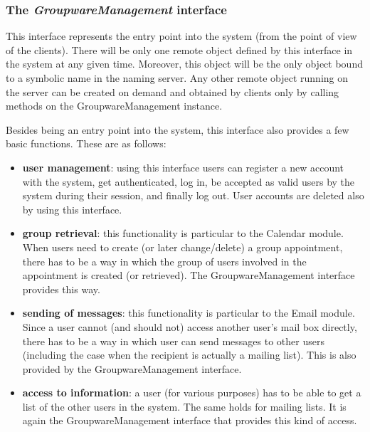 \documentclass[a4paper,10pt]{article}
\begin{document}
\subsubsection*{The \emph{GroupwareManagement} interface}

This interface represents the entry point into the system (from the point of view of the clients).
There will be only one remote object defined by this interface in the system at any given time.
Moreover, this object will be the only object bound to a symbolic name in the naming server. Any
other remote object running on the server can be created on demand and obtained by clients
only by calling methods on the GroupwareManagement instance.

Besides being an entry point into the system, this interface also provides a few basic functions.
These are as follows:

\begin{itemize}

\item \textbf{user management}: using this interface users can register a new account with the
system, get authenticated, log in, be accepted as valid users by the system during their session,
and finally log out. User accounts are deleted also by using this interface.

\item \textbf{group retrieval}: this functionality is particular to the Calendar module. When users
need to create (or later change/delete) a group appointment, there has to be a way in which the
group of users involved in the appointment is created (or retrieved). The GroupwareManagement
interface provides this way.

\item \textbf{sending of messages}: this functionality is particular to the Email module. Since a
user cannot (and should not) access another user's mail box directly, there has to be a way in
which user can send messages to other users (including the case when the recipient is actually
a mailing list). This is also provided by the GroupwareManagement interface.

\item \textbf{access to information}: a user (for various purposes) has to be able to get a list of the
other users in the system. The same holds for mailing lists. It is again the GroupwareManagement
interface that provides this kind of access.

\end{itemize}
\end{document}
